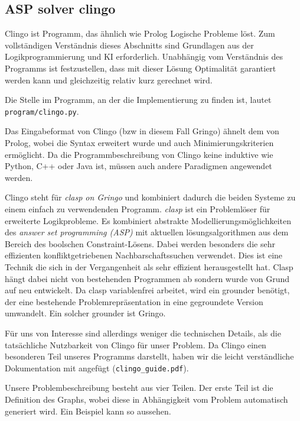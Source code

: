 \subsection{ASP solver clingo}

Clingo ist Programm, das ähnlich wie Prolog Logische Probleme löst. Zum vollständigen Verständnis dieses Abschnitts sind Grundlagen aus der Logikprogrammierung und KI erforderlich. Unabhängig vom Verständnis des Programms ist festzustellen, dass mit dieser Lösung Optimalität garantiert werden kann und gleichzeitig relativ kurz gerechnet wird. 

Die Stelle im Programm, an der die Implementierung zu finden ist, lautet \texttt{program/clingo.py}.

Das Eingabeformat von Clingo (bzw in diesem Fall Gringo) ähnelt dem von Prolog, wobei die Syntax erweitert wurde und auch Minimierungskriterien ermöglicht. Da die Programmbeschreibung von Clingo keine induktive wie Python, C++ oder Java ist, müssen auch andere Paradigmen angewendet werden. 

Clingo steht für \emph{clasp on Gringo} und kombiniert dadurch die beiden Systeme zu einem einfach zu verwendenden Programm. \emph{clasp} ist ein Problemlöser für erweiterte Logikprobleme. Es kombiniert abstrakte Modellierungsmöglichkeiten des \emph{answer set programming (ASP)} mit aktuellen lösungsalgorithmen aus dem Bereich des boolschen Constraint-Lösens. Dabei werden besonders die sehr effizienten konfliktgetriebenen Nachbarschaftssuchen verwendet. Dies ist eine Technik die sich in der Vergangenheit als sehr effizient herausgestellt hat. Clasp hängt dabei nicht von bestehenden Programmen ab sondern wurde von Grund auf neu entwickelt. Da clasp variablenfrei arbeitet, wird ein grounder benötigt, der eine bestehende Problemrepräsentation in eine gegroundete Version umwandelt. Ein solcher grounder ist Gringo. 

Für uns von Interesse sind allerdings weniger die technischen Details, als die tatsächliche Nutzbarkeit von Clingo für unser Problem. Da Clingo einen besonderen Teil unseres Programms darstellt, haben wir die leicht verständliche Dokumentation mit angefügt (\texttt{clingo\_guide.pdf}).

Unsere Problembeschreibung besteht aus vier Teilen. Der erste Teil ist die Definition des Graphs, wobei diese in Abhängigkeit vom Problem automatisch generiert wird. Ein Beispiel kann so aussehen.



